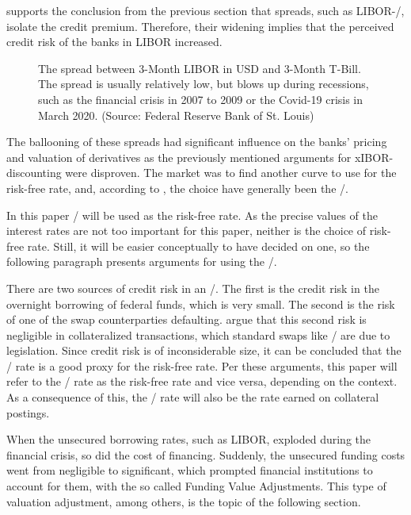 \documentclass[main.tex]{subfiles}
\begin{document}
     supports the conclusion from the previous section
    that spreads, such as LIBOR-\OIS/, isolate the credit premium.
    Therefore, their widening implies that the perceived credit risk of the banks in LIBOR increased.

    \begin{figure}
        \centering
        \resizebox{\textwidth}{!}{%
            
        }
        \caption{
            The spread between 3-Month LIBOR in USD and 3-Month T-Bill.
            The spread is usually relatively low, 
            but blows up during recessions, 
            such as the financial crisis in 2007 to 2009 or
            the Covid-19 crisis in March 2020.
            (Source: Federal Reserve Bank of St. Louis)
        }
        \label{fig:ted-spread}
    \end{figure}

    The ballooning of these spreads
    had significant influence on the banks' pricing and valuation of derivatives
    as the previously mentioned arguments for xIBOR-discounting were disproven.
    The market was to find another curve to use for the risk-free rate,
    and, according to \textcite{Green2015XVA}, the choice have generally been the \OIS/.

    In this paper \OIS/ will be used as the risk-free rate.
    As the precise values of the interest rates are not too important for this paper,
    neither is the choice of risk-free rate.
    Still, it will be easier conceptually to have decided on one,
    so the following paragraph presents arguments for using the \OIS/.

    There are two sources of credit risk in an \OIS/.
    The first is the credit risk in the overnight borrowing of federal funds, which is very small. 
    The second is the risk of one of the swap counterparties defaulting.
    \textcite{HullWhiteOISvsLIBOR}
    argue that this second risk is negligible in collateralized transactions,
    which standard swaps like \OIS/ are due to legislation.
    Since credit risk is of inconsiderable size, it can be concluded 
    that the \OIS/ rate is a good proxy for the risk-free rate.
    Per these arguments, this paper will refer to the \OIS/ rate as the risk-free rate
    and vice versa, depending on the context.
    As a consequence of this, the \OIS/ rate will also be the rate earned on collateral postings.

    When the unsecured borrowing rates, such as LIBOR, exploded during the financial crisis, 
    so did the cost of financing. 
    Suddenly, the unsecured funding costs went from negligible to significant,
    which prompted financial institutions to account for them, 
    with the so called Funding Value Adjustments. 
    This type of valuation adjustment, among others, is the topic of the following section.
\end{document}
